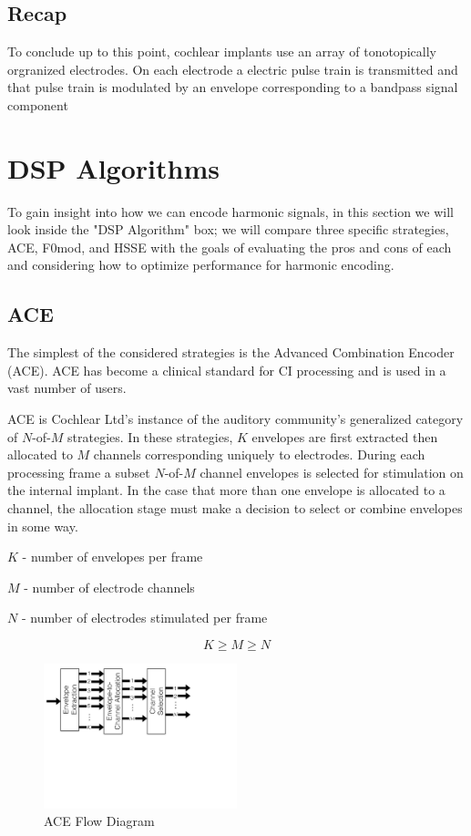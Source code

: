 \documentclass [11pt, proquest,oneside] {uwthesis}[2015/03/03]
\begin{document}
\subsection{Recap}

To conclude up to this point, cochlear implants use an array of tonotopically orgranized electrodes.  On each electrode a electric pulse train is transmitted and that pulse train is modulated by an envelope corresponding to a bandpass signal component

\section{DSP Algorithms}

To gain insight into how we can encode harmonic signals, in this section we will look inside the "DSP Algorithm" box; we will compare three specific strategies, ACE, F0mod, and HSSE with the goals of evaluating the pros and cons of each and considering how to optimize performance for harmonic encoding.

\subsection{ACE}\label{ss:ACE}

The simplest of the considered strategies is the Advanced Combination Encoder (ACE).  ACE has become a clinical standard for CI processing and is used in a vast number of users.

ACE is Cochlear Ltd's instance of the auditory community's generalized category of $N$-of-$M$ strategies.  In these strategies, $K$ envelopes are first extracted then allocated to $M$ channels corresponding uniquely to electrodes.  During each processing frame a subset $N$-of-$M$ channel envelopes is selected for stimulation on the internal implant.  In the case that more than one envelope is allocated to a channel, the allocation stage must make a decision to select or combine envelopes in some way.

$K$ - number of envelopes per frame

$M$ - number of electrode channels

$N$ - number of electrodes stimulated per frame

$$K \geq M \geq N$$

\begin{figure}[!ht]
  \centering
    \includegraphics[width=0.5\textwidth]{ACE_flow_diagram_explicit}   
    \caption{ACE Flow Diagram}
\end{figure}
\end{document}
